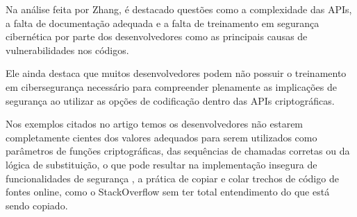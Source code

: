 Na análise feita por Zhang, é destacado questões como a complexidade das APIs, a falta de documentação adequada e a falta de treinamento em segurança cibernética por parte dos desenvolvedores \cite{api_misuses_zhang} como as principais causas de vulnerabilidades nos códigos. 

Ele ainda destaca que muitos desenvolvedores podem não possuir o treinamento em cibersegurança necessário para compreender plenamente as implicações de segurança ao utilizar as opções de codificação dentro das APIs criptográficas. 

Nos exemplos citados no artigo temos os desenvolvedores não estarem completamente cientes dos valores adequados para serem utilizados como parâmetros de funções criptográficas, das sequências de chamadas corretas ou da lógica de substituição, o que pode resultar na implementação insegura de funcionalidades de segurança \cite{api_misuses_zhang}, a prática de copiar e colar trechos de código de fontes online, como o StackOverflow sem ter total entendimento do que está sendo copiado.



